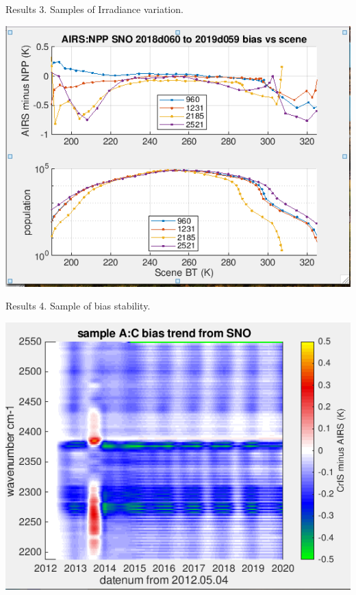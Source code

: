\documentclass[10pt,t]{beamer}
\begin{document}
\begin{frame}{Results 3. Samples of Irradiance variation.}

  \begin{center}
    \includegraphics[width=0.6\linewidth]{./Figs/plot1.png}
  \end{center}

  
\end{frame}

\begin{frame}{Results 4. Sample of bias stability.}

  \begin{center}
    \includegraphics[width=0.6\linewidth]{./Figs/plot6.png}
  \end{center}
  
  
\end{frame}
\end{document}
